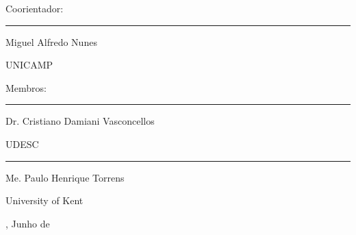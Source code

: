 \begin{folhadeaprovacao}
    \vspace*{\baselineskip}
    {Coorientador:}

    \begin{center}
        \begin{minipage}{8.75cm}
            \begin{flushleft}
                \rule{8.75cm}{0.1mm}

                Miguel Alfredo Nunes \par
                UNICAMP
            \end{flushleft}
        \end{minipage}
    \end{center}

    \vspace*{\baselineskip}
    {Membros:}

    \begin{center}
        \begin{minipage}{8.75cm}
            \begin{flushleft}
                \rule{8.75cm}{0.1mm}

                Dr. Cristiano Damiani Vasconcellos \par
                UDESC

                \vspace*{1cm}
                \rule{8.75cm}{0.1mm}

                Me. Paulo Henrique Torrens \par
                University of Kent
            \end{flushleft}
        \end{minipage}
    \end{center}

    \vspace*{\fill}
    \begin{center}
    {\imprimirlocal, Junho de \imprimirdata}
    \end{center}
    \vspace*{0.25cm}
\end{folhadeaprovacao}




